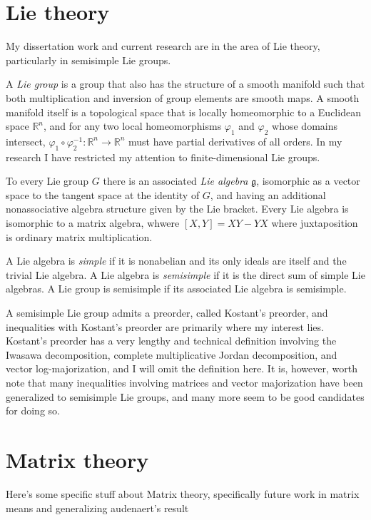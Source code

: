 \documentclass[11pt]{article}
\begin{document}
\section{Lie theory}

My dissertation work and current research are in the area of Lie theory,
particularly in semisimple Lie groups.

A \emph{Lie group} is a group that also has the structure of a smooth manifold
such that both multiplication and inversion of group elements are smooth maps. A
smooth manifold itself is a topological space that is locally homeomorphic to a
Euclidean space \( \mathbb{R}^n \),
and for any two local homeomorphisms \( \varphi_1 \)
and \( \varphi_2 \)
whose domains intersect,
\( \varphi_1 \circ \varphi_2^{-1}: \mathbb{R}^n \to \mathbb{R}^n \)
must have partial derivatives of all orders. In my research I have restricted my
attention to finite-dimensional Lie groups.

To every Lie group $G$ there is an associated \emph{Lie algebra} \(
\mathfrak{g} \), isomorphic as a vector space to the tangent space at the identity
of $G$, and having an additional nonassociative algebra structure given by the
Lie bracket. Every Lie algebra is isomorphic to a matrix algebra, whwere \(
[X,Y] = XY - YX \) where juxtaposition is ordinary matrix multiplication. 

A Lie algebra is \emph{simple} if it is nonabelian and its only ideals are
itself and the trivial Lie algebra. A Lie algebra is \emph{semisimple} if it is
the direct sum of simple Lie algebras. A Lie group is semisimple if its
associated Lie algebra is semisimple.

A semisimple Lie group admits a preorder, called Kostant's preorder, and
inequalities with Kostant's preorder are primarily where my interest
lies. Kostant's preorder has a very lengthy and technical definition involving
the Iwasawa decomposition, complete multiplicative Jordan decomposition, and
vector log-majorization, and I will omit the definition here. It is, however,
worth note that many inequalities involving matrices and vector majorization
have been generalized to semisimple Lie groups, and many more seem to be good
candidates for doing so.

\section{Matrix theory}

Here's some specific stuff about Matrix theory, specifically future work in
matrix means and generalizing audenaert's result
\end{document}
